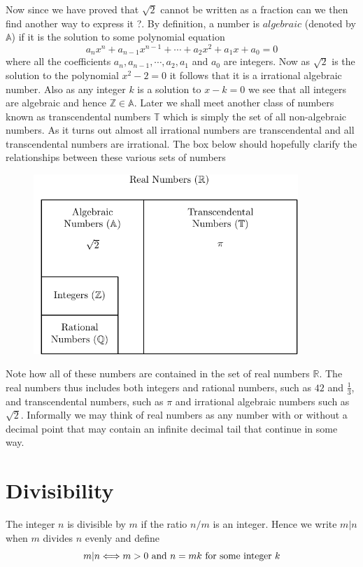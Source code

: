 \myindent Now since we have proved that $\sqrt{2}$ cannot be written as a fraction can we then find another way to express it ?. By definition, a number is $algebraic$ (denoted by $\mathbb{A}$) if it is the solution to some polynomial equation
\[
a_{n}x^{n} + a_{n-1}x^{n-1} + \cdots + a_{2}x^{2} + a_{1}x + a_0 = 0
\]
where all the coefficients $a_n, a_{n-1}, \cdots, a_2, a_1$ and $a_0$ are integers. Now as $\sqrt{2}$ is the solution to the polynomial $x^2 - 2 = 0$ it follows that it is a irrational algebraic number. Also as any integer $k$ is a solution to $x-k=0$ we see that all integers are algebraic and hence $\mathbb{Z} \in \mathbb{A}$. Later we shall meet another class of numbers known as transcendental numbers $\mathbb{T}$ which is simply the set of all non-algebraic numbers. As it turns  out almost all irrational numbers are transcendental and all transcendental numbers are irrational. The box below should hopefully clarify the relationships between these various sets of numbers
\begin{figure}[htb!]
\begin{center}
\includegraphics[width=10cm]{images/number_types.pdf}
\end{center}
\end{figure}
Note how all of these numbers are contained in the set of real numbers $\mathbb{R}$. The real numbers thus includes both integers and rational numbers, such as $42$ and $\frac{1}{3}$, and transcendental numbers, such as $\pi$ and irrational algebraic numbers such as $\sqrt{2}$. Informally we may think of real numbers as any number with or without a decimal point that may contain an infinite decimal tail that continue in some way.

\section{Divisibility}
The integer $n$ is divisible by $m$ if the ratio $n/m$ is an integer. Hence we write $m|n$ when $m$ divides $n$ evenly and define
\begin{equation}\label{divisibility}
m|n \Longleftrightarrow m > 0 \textnormal{ and } n = mk
\textnormal{ for some integer } k
\end{equation}

